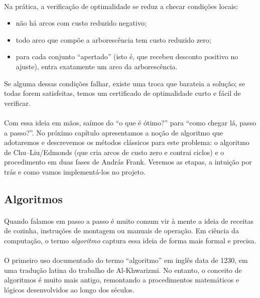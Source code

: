 \documentclass[12pt,a4paper]{article}
\begin{document}
\paragraph{}
Na prática, a verificação de optimalidade se reduz a checar condições locais:
\begin{itemize}\setlength{\itemsep}{2pt}
    \item não há arcos com custo reduzido negativo;
    \item todo arco que compõe a arborescência tem custo reduzido zero;
    \item para cada conjunto “apertado” (isto é, que recebeu desconto positivo no ajuste), entra exatamente um arco da arborescência.
\end{itemize}
Se alguma dessas condições falhar, existe uma troca que barateia a solução; se todas forem satisfeitas, temos um certificado de optimalidade curto e fácil de verificar.

\paragraph{}
Com essa ideia em mãos, saímos do “o que é ótimo?” para “como chegar lá, passo a passo?”. No próximo capítulo apresentamos a noção de algoritmo que adotaremos e descrevemos os métodos clássicos para este problema: o algoritmo de Chu–Liu/Edmonds (que cria arcos de custo zero e contrai ciclos) e o procedimento em duas fases de András Frank. Veremos as etapas, a intuição por trás e como vamos implementá-los no projeto.

\subsection{Algoritmos}
\paragraph{}
Quando falamos em passo a passo é muito comum vir à mente a ideia de receitas de cozinha, instruções de montagem ou manuais de operação. Em ciência da computação, o termo \emph{algoritmo} captura essa ideia de forma mais formal e precisa.

\paragraph{}O primeiro uso documentado do termo “algoritmo” em inglês data de 1230, em uma tradução latina do trabalho de Al-Khwarizmi. No entanto, o conceito de algoritmos é muito mais antigo, remontando a procedimentos matemáticos e lógicos desenvolvidos ao longo dos séculos.
\end{document}
